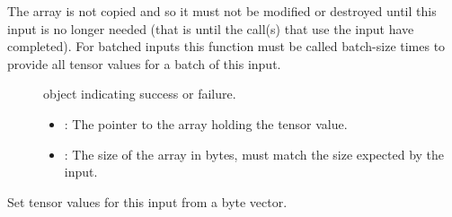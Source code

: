 \documentclass[letterpaper,10pt,english]{sphinxmanual}
\begin{document}
\begin{fulllineitems}
\begin{fulllineitems}
\begin{fulllineitems}
The array is not copied and so it must not be modified or destroyed until this input is no longer needed (that is until the {\hyperref[\detokenize{cpp_api/classnvidia_1_1inferenceserver_1_1client_1_1InferContext:classnvidia_1_1inferenceserver_1_1client_1_1InferContext_1a4cac8002817c9259851305b14c258f36}]{}} call(s) that use the input have completed). For batched inputs this function must be called batch-size times to provide all tensor values for a batch of this input. \begin{description}
\item[{}] \leavevmode
{\hyperref[\detokenize{cpp_api/classnvidia_1_1inferenceserver_1_1client_1_1Error:classnvidia_1_1inferenceserver_1_1client_1_1Error}]{}} object indicating success or failure. 

\item[{}] \leavevmode\begin{itemize}
\item {} 
: The pointer to the array holding the tensor value. 

\item {} 
: The size of the array in bytes, must match the size expected by the input. 

\end{itemize}

\end{description}


\end{fulllineitems}


\begin{fulllineitems}
\label{\detokenize{cpp_api/classnvidia_1_1inferenceserver_1_1client_1_1InferContext:_CPPv4N6nvidia15inferenceserver6client12InferContext5Input6SetRawERKNSt6vectorI7uint8_tEE}}%
\pysigstartmultiline
{}\label{\detokenize{cpp_api/classnvidia_1_1inferenceserver_1_1client_1_1InferContext:classnvidia_1_1inferenceserver_1_1client_1_1InferContext_1_1Input_1a094ec9eece1e10d877db9af69867090e}}%
\pysigstopmultiline
Set tensor values for this input from a byte vector. 


\end{fulllineitems}
\end{fulllineitems}
\end{fulllineitems}
\end{document}
